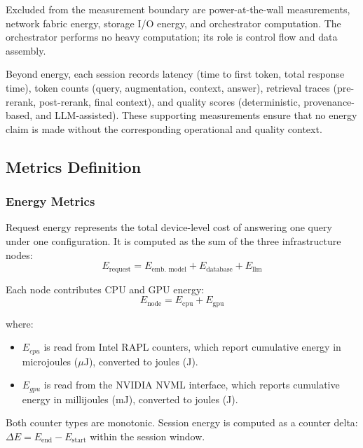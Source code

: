 Excluded from the measurement boundary are power-at-the-wall measurements, network
fabric energy, storage I/O energy, and orchestrator computation. The orchestrator
performs no heavy computation; its role is control flow and data assembly.


Beyond energy, each session records latency (time to first token, total
response time), token counts (query, augmentation, context, answer), retrieval
traces (pre-rerank, post-rerank, final context), and quality scores
(deterministic, provenance-based, and LLM-assisted). These supporting
measurements ensure that no energy claim is made without the corresponding
operational and quality context.


\subsection{Metrics Definition}
\label{subsec:metrics}

\subsubsection{Energy Metrics}
\label{subsubsec:energy-metrics}
Request energy represents the total device-level cost of answering one query
under one configuration. It is computed as the sum of the three infrastructure
nodes:
$$E_{\text{request}} = E_{\text{emb. model}} + E_{\text{database}} + E_{\text{llm}}$$

Each node contributes CPU and GPU energy:
$$E_{\text{node}} = E_{\text{cpu}} + E_{\text{gpu}}$$

where:
\begin{itemize}
    \item \textbf{$E_{cpu}$} is read from Intel RAPL counters, which report
          cumulative energy in microjoules ($\mu$J), converted to joules (J).
    \item \textbf{$E_{gpu}$} is read from the NVIDIA NVML interface, which
          reports cumulative energy in millijoules (mJ), converted to joules (J).
\end{itemize}

Both counter types are monotonic. Session energy is computed as a counter delta:
$\Delta E = E_{\text{end}} - E_{\text{start}}$ within the session window.

